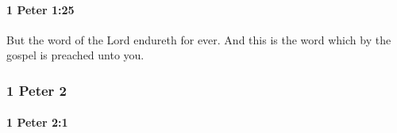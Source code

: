 		\paragraph{1 Peter 1:25} %
			\label{1PETER-1-25}

			But the word of the Lord endureth for ever.  And this is the word which by the gospel is preached unto you.

			\begin{framed}
			\scriptsize
				\begin{compactdesc}
					\item[SBLG] 
				\end{compactdesc}
			\end{framed}

	\subsubsection{1 Peter 2} %
		\label{1PETER-2}
		
		\paragraph{1 Peter 2:1} %
			\label{1PETER-2-1}

			\phantom{.}

